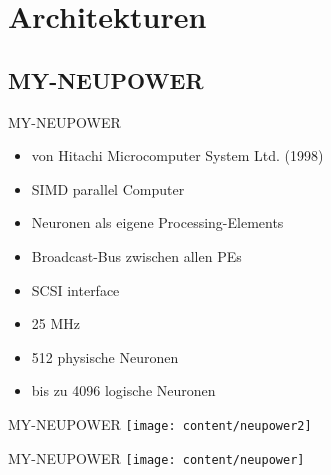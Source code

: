 \section{Architekturen}


\subsection{MY-NEUPOWER}
\begin{slide}{MY-NEUPOWER}
	\begin{itemize}
		\item von Hitachi Microcomputer System Ltd. (1998)
		\item SIMD parallel Computer
		\item Neuronen als eigene Processing-Elements
		\item Broadcast-Bus zwischen allen PEs
		\item SCSI interface
		\item 25 MHz
		\item 512 physische Neuronen
		\item bis zu 4096 logische Neuronen
	\end{itemize}
\end{slide}

\begin{slide}{MY-NEUPOWER}
	\texttt{[image: content/neupower2]}
\end{slide}

\begin{slide}{MY-NEUPOWER}
	\texttt{[image: content/neupower]}
\end{slide}

